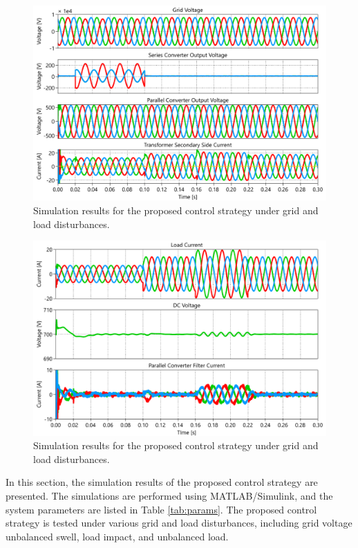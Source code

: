\begin{figure}
    \centering
    \includegraphics[width=\textwidth]{Images/Sim1.pdf}
    \caption{Simulation results for the proposed control strategy under grid and load disturbances.}
    \label{fig:sim1}
\end{figure}

\begin{figure}
    \centering
    \includegraphics[width=\textwidth]{Images/Sim2.pdf}
    \caption{Simulation results for the proposed control strategy under grid and load disturbances.}
    \label{fig:sim2}
\end{figure}

In this section, the simulation results of the proposed control strategy are presented. The simulations are performed using MATLAB/Simulink, and the system parameters are listed in Table \ref{tab:params}. The proposed control strategy is tested under various grid and load disturbances, including grid voltage unbalanced swell, load impact, and unbalanced load.

